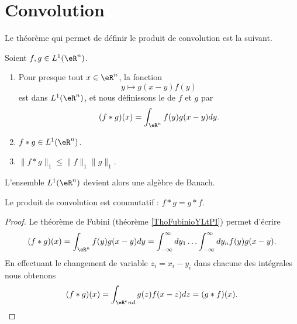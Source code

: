 
\section{Convolution}

Le théorème qui permet de définir le produit de convolution est la suivant.

\begin{theorem}
    Soient \( f,g\in L^1(\eR^n)\). 
    \begin{enumerate}
        \item
            Pour presque tout \( x\in \eR^n\), la fonction
            \begin{equation}
                y\mapsto g(x-y)f(y)
            \end{equation}
            est dans \( L^1(\eR^n)\), et nous définissons le  de \( f\) et \( g\) par
            \begin{equation}
                (f*g)(x)=\int_{\eR^n} f(y)g(x-y)dy.
            \end{equation}
        \item
            \( f*g\in L^1(\eR^n)\).
        \item
            \( \| f*g \|_1\leq \| f \|_1\| g \|_1\).
    \end{enumerate}
\end{theorem}

L'ensemble \( L^1(\eR^n)\) devient alors une algèbre de Banach.

\begin{lemma}
    Le produit de convolution est commutatif : \( f*g=g*f\).
\end{lemma}

\begin{proof}
    Le théorème de Fubini (théorème \ref{ThoFubinioYLtPI}) permet d'écrire
    \begin{equation}
        (f*g)(x)=\int_{\eR^n}f(y)g(x-y)dy=\int_{-\infty}^{\infty}dy_1\ldots \int_{-\infty}^{\infty}dy_nf(y)g(x-y).
    \end{equation}
    En effectuant le changement de variable \( z_i=x_i-y_i\) dans chacune des intégrales nous obtenons
    \begin{equation}
        (f*g)(x)=\int_{\eR^end}g(z)f(x-z)dz=(g*f)(x).
    \end{equation}
\end{proof}


